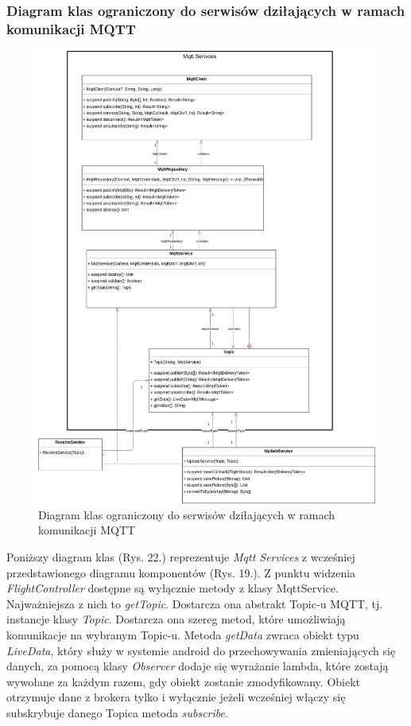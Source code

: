 \subsubsection{Diagram klas ograniczony do serwisów dziłających w ramach komunikacji MQTT}

\begin{figure}[!htp]
  \centering
  \includegraphics[width=16cm]{./Obrazy/services.png}
  \caption{Diagram klas ograniczony do serwisów dziłających w ramach komunikacji MQTT}
  \end{figure}

  Poniższy diagram klas (Rys. 22.) reprezentuje \textit{Mqtt Services} z wcześniej przedstawionego diagramu komponentów (Rys. 19.). Z punktu widzenia \textit{FlightController} dostępne są wyłącznie metody z klasy MqttService. Najważniejsza z nich to \textit{getTopic}. Dostarcza ona abstrakt Topic-u MQTT, tj. instancje klasy \textit{Topic}. Dostarcza ona szereg metod, które umożliwiają komunikacje na wybranym Topic-u. Metoda \textit{getData} zwraca obiekt typu \textit{LiveData}, który służy w systemie android do przechowywania zmieniających się danych, za pomocą klasy \textit{Observer} dodaje się wyrażanie lambda, które zostają wywołane za każdym razem, gdy obiekt zostanie zmodyfikowany. Obiekt otrzymuje dane z brokera tylko i wyłącznie jeżeli wcześniej włączy się subskrybuje danego Topica metoda \textit{subscribe}.

